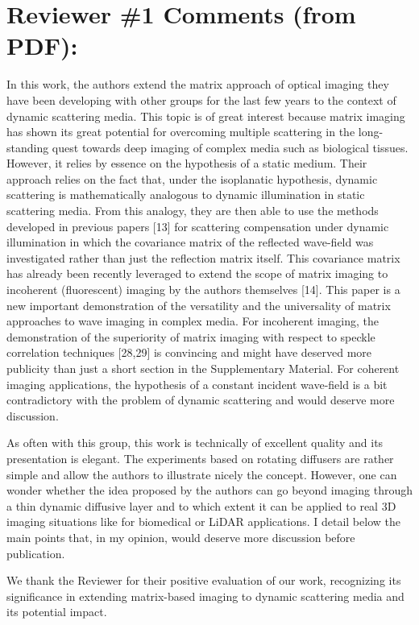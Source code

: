 \documentclass[12pt]{article}
\newenvironment{ourresponse}
    {\begin{tcolorbox}[width=\linewidth,breakable,enhanced,colback=gray!5,colframe=responsecolor!50,title=Response,left=5pt,right=5pt]}
    {\end{tcolorbox}}
\begin{document}
\section{Reviewer \#1 Comments (from PDF):}

In this work, the authors extend the matrix approach of optical imaging they have been developing with other groups for the last few years to the context of dynamic scattering media. This topic is of great interest because matrix imaging has shown its great potential for overcoming multiple scattering in the long-standing quest towards deep imaging of complex media such as biological tissues. However, it relies by essence on the hypothesis of a static medium. Their approach relies on the fact that, under the isoplanatic hypothesis, dynamic scattering is mathematically analogous to dynamic illumination in static scattering media. From this analogy, they are then able to use the methods developed in previous papers [13] for scattering compensation under dynamic illumination in which the covariance matrix of the reflected wave-field was investigated rather than just the reflection matrix itself. This covariance matrix has already been recently leveraged to extend the scope of matrix imaging to incoherent (fluorescent) imaging by the authors themselves [14]. This paper is a new important demonstration of the versatility and the universality of matrix approaches to wave imaging in complex media. For incoherent imaging, the demonstration of the superiority of matrix imaging with respect to speckle correlation techniques [28,29] is convincing and might have deserved more publicity than just a short section in the Supplementary Material. For coherent imaging applications, the hypothesis of a constant incident wave-field is a bit contradictory with the problem of dynamic scattering and would deserve more discussion.  

As often with this group, this work is technically of excellent quality and its presentation is elegant. The experiments based on rotating diffusers are rather simple and allow the authors to illustrate nicely the concept. However, one can wonder whether the idea proposed by the authors can go beyond imaging through a thin dynamic diffusive layer and to which extent it can be applied to real 3D imaging situations like for biomedical or LiDAR applications. I detail below the main points that, in my opinion, would deserve more discussion before publication.

\begin{ourresponse}
    We thank the Reviewer for their positive evaluation of our work, recognizing its significance in extending matrix-based imaging to dynamic scattering media and its potential impact.
\end{ourresponse}
\end{document}
